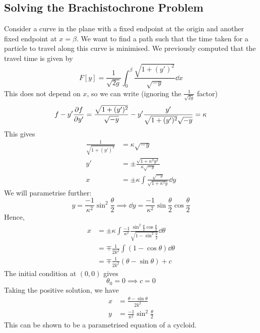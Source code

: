 \subsection{Solving the Brachistochrone Problem}
Consider a curve in the plane with a fixed endpoint at the origin and another fixed endpoint at \(x = \beta\). We want to find a path such that the time taken for a particle to travel along this curve is minimised. We previously computed that the travel time is given by
\[ F[y] = \frac{1}{\sqrt{2g}} \int_0^\beta \frac{\sqrt{1 + (y')^2}}{\sqrt{-y}} \dd{x} \]
This does not depend on \(x\), so we can write (ignoring the \( \frac{1}{\sqrt{2g}} \) factor)
\[
    f - y' \pdv{f}{y'} = \frac{\sqrt{1 + (y')^2}}{\sqrt{-y}} - y' \frac{y'}{\sqrt{1 + (y')^2} \sqrt{-y}} = \kappa
\]
This gives
\begin{align*}
    \frac{1}{\sqrt{1 + (y')^2}} &= \kappa \sqrt{-y} \\
    y' &= \pm \frac{\sqrt{1 + \kappa^2 y^2}}{\kappa\sqrt{-y}} \\
    x &= \pm \kappa \int \frac{\sqrt{-y}}{\sqrt{1 + \kappa^2 y}} \dd{y}
\end{align*}
We will parametrise further:
\[ y = \frac{-1}{\kappa^2} \sin^2 \frac{\theta}{2} \implies \dd{y} = \frac{-1}{\kappa^2}\sin \frac{\theta}{2} \cos\frac{\theta}{2} \]
Hence,
\begin{align*}
    x &= \pm \kappa \int \frac{-1}{\kappa^2} \frac{\sin^2 \frac{\theta}{2} \cos \frac{\theta}{2}}{\sqrt{1 - \sin^2 \frac{\theta}{2}}} \dd{\theta} \\
    &= \mp \frac{1}{2k^2} \int (1 - \cos\theta) \dd{\theta} \\
    &= \mp \frac{1}{2k^2}(\theta - \sin\theta) + c
\end{align*}
The initial condition at \((0, 0)\) gives
\[ \theta_0 = 0 \implies c = 0 \]
Taking the positive solution, we have
\begin{align*}
    x &= \frac{\theta - \sin\theta}{2k^2} \\
    y &= \frac{-1}{\kappa^2} \sin^2 \frac{\theta}{2}
\end{align*}
This can be shown to be a parametrised equation of a cycloid.

